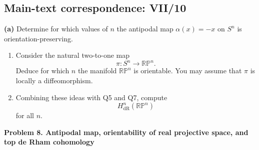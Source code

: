 \subsection*{Main-text correspondence: VII/10}

\begin{problem}
\label{prob:cp-vii-0035}
\noindent\textbf{(a)} Determine for which values of \(n\) the antipodal map
\(\alpha(x)=-x\) on \(S^n\) is orientation-preserving.

\begin{enumerate}
\item[(b)] Consider the natural two-to-one map
\[
\pi:S^n\longrightarrow\mathbb{RP}^n.
\]
Deduce for which \(n\) the manifold \(\mathbb{RP}^n\) is orientable.
You may assume that \(\pi\) is locally a diffeomorphism.

\item[(c)] Combining these ideas with Q5 and Q7, compute
\[
H^n_{\mathrm{dR}}(\mathbb{RP}^n)
\]
for all \(n\).
\end{enumerate}
	
	
	\textbf{Problem 8. Antipodal map, orientability of real projective space, and top de Rham cohomology}
\end{problem}

